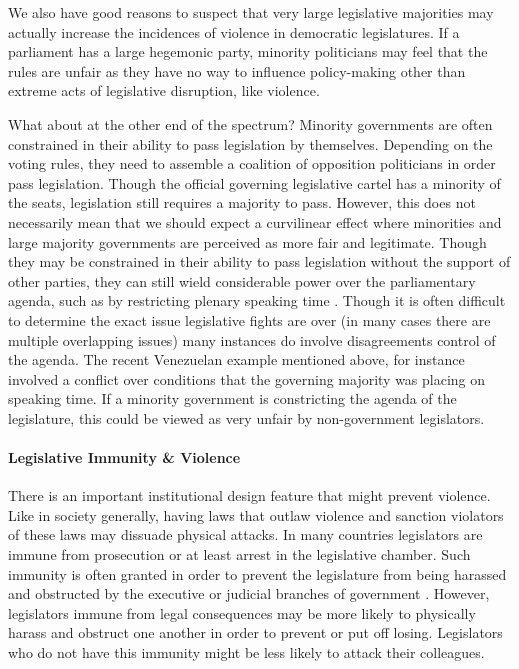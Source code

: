 \documentclass[a4paper]{article}\usepackage{graphicx, color}
\begin{document}
We also have good reasons to suspect that very large legislative majorities may actually increase the incidences of violence in democratic legislatures. If a parliament has a large hegemonic party, minority politicians may feel that the rules are unfair as they have no way to influence policy-making other than extreme acts of legislative disruption, like violence.

What about at the other end of the spectrum? Minority governments are often constrained in their ability to pass legislation by themselves. Depending on the voting rules, they need to assemble a coalition of opposition politicians in order pass legislation. Though the official governing legislative cartel has a minority of the seats, legislation still requires a majority to pass. However, this does not necessarily mean that we should expect a curvilinear effect where minorities and large majority governments are perceived as more fair and legitimate. Though they may be constrained in their ability to pass legislation without the support of other parties, they can still wield considerable power over the parliamentary agenda, such as by restricting plenary speaking time \citep{Tsebelis2002,cox2007}. Though it is often difficult to determine the exact issue legislative fights are over (in many cases there are multiple overlapping issues) many instances do involve disagreements control of the agenda. The recent Venezuelan example mentioned above, for instance involved a conflict over conditions that the governing majority was placing on speaking time. If a minority government is constricting the agenda of the legislature, this could be viewed as very unfair by non-government legislators. 

\paragraph{Legislative Immunity \& Violence}

There is an important institutional design feature that might prevent violence. Like in society generally, having laws that outlaw violence and sanction violators of these laws may dissuade physical attacks. In many countries legislators are immune from prosecution or at least arrest in the legislative chamber. Such immunity is often granted in order to prevent the legislature from being harassed and obstructed by the executive or judicial branches of government  \citep{Seghetti1984}. However, legislators immune from legal consequences may be more likely to physically harass and obstruct one another in order to prevent or put off losing. Legislators who do not have this immunity might be less likely to attack their colleagues. 
\end{document}
